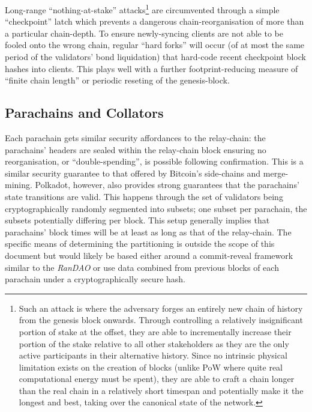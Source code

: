 \documentclass{beamer}
\begin{document}
\begin{frame}
Long-range ``nothing-at-stake'' attacks\footnote{Such an attack is where the adversary forges an entirely new chain of history from the genesis block onwards. Through controlling a relatively insignificant portion of stake at the offset, they are able to incrementally increase their portion of the stake relative to all other stakeholders as they are the only active participants in their alternative history. Since no intrinsic physical limitation exists on the creation of blocks (unlike PoW where quite real computational energy must be spent), they are able to craft a chain longer than the real chain in a relatively short timespan and potentially make it the longest and best, taking over the canonical state of the network.} are circumvented through a simple ``checkpoint'' latch which prevents a dangerous chain-reorganisation of more than a particular chain-depth. To ensure newly-syncing clients are not able to be fooled onto the wrong chain, regular ``hard forks'' will occur (of at most the same period of the validators' bond liquidation) that hard-code recent checkpoint block hashes into clients. This plays well with a further footprint-reducing measure of ``finite chain length'' or periodic reseting of the genesis-block.

\subsection{Parachains and Collators}\label{parachains-and-collators}

 Each parachain gets similar security affordances to the relay-chain: the parachains' headers are sealed within the relay-chain block ensuring no reorganisation, or ``double-spending'', is possible following confirmation. This is a similar security guarantee to that offered by Bitcoin's side-chains and merge-mining. Polkadot, however, also provides strong guarantees that the parachains' state transitions are valid. This happens through the set of validators being cryptographically randomly segmented into subsets; one subset per parachain, the subsets potentially differing per block. This setup generally implies that parachains' block times will be at least as long as that of the relay-chain. The specific means of determining the partitioning is outside the scope of this document but would likely be based either around a commit-reveal framework similar to the \textit{RanDAO}\cite{randao} or use data combined from previous blocks of each parachain under a cryptographically secure hash.


\end{frame}
\end{document}
